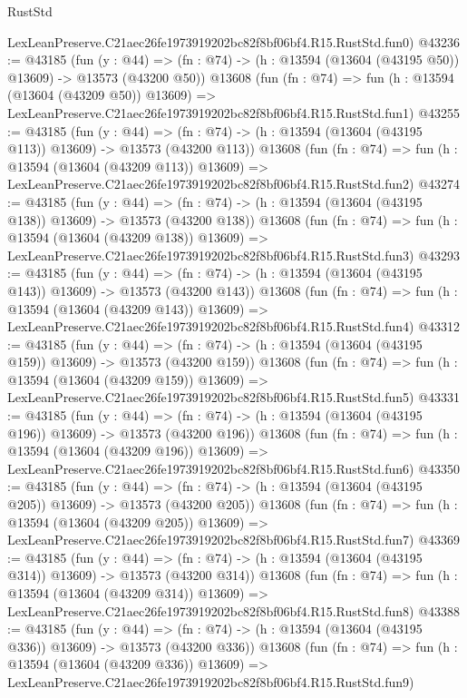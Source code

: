 \begin{lexlean}{RustStd}
\begin{coremodule}
    LexLeanPreserve.C21aec26fe1973919202bc82f8bf06bf4.R15.RustStd.fun0)
@43236 := @43185
    (fun (y : @44) =>
    (fn : @74) -> (h : @13594 (@13604 (@43195 @50)) @13609) -> @13573 (@43200 @50))
    @13608
    (fun (fn : @74) =>
    fun (h : @13594 (@13604 (@43209 @50)) @13609) =>
    LexLeanPreserve.C21aec26fe1973919202bc82f8bf06bf4.R15.RustStd.fun1)
@43255 := @43185
    (fun (y : @44) =>
    (fn : @74) -> (h : @13594 (@13604 (@43195 @113)) @13609) -> @13573 (@43200 @113))
    @13608
    (fun (fn : @74) =>
    fun (h : @13594 (@13604 (@43209 @113)) @13609) =>
    LexLeanPreserve.C21aec26fe1973919202bc82f8bf06bf4.R15.RustStd.fun2)
@43274 := @43185
    (fun (y : @44) =>
    (fn : @74) -> (h : @13594 (@13604 (@43195 @138)) @13609) -> @13573 (@43200 @138))
    @13608
    (fun (fn : @74) =>
    fun (h : @13594 (@13604 (@43209 @138)) @13609) =>
    LexLeanPreserve.C21aec26fe1973919202bc82f8bf06bf4.R15.RustStd.fun3)
@43293 := @43185
    (fun (y : @44) =>
    (fn : @74) -> (h : @13594 (@13604 (@43195 @143)) @13609) -> @13573 (@43200 @143))
    @13608
    (fun (fn : @74) =>
    fun (h : @13594 (@13604 (@43209 @143)) @13609) =>
    LexLeanPreserve.C21aec26fe1973919202bc82f8bf06bf4.R15.RustStd.fun4)
@43312 := @43185
    (fun (y : @44) =>
    (fn : @74) -> (h : @13594 (@13604 (@43195 @159)) @13609) -> @13573 (@43200 @159))
    @13608
    (fun (fn : @74) =>
    fun (h : @13594 (@13604 (@43209 @159)) @13609) =>
    LexLeanPreserve.C21aec26fe1973919202bc82f8bf06bf4.R15.RustStd.fun5)
@43331 := @43185
    (fun (y : @44) =>
    (fn : @74) -> (h : @13594 (@13604 (@43195 @196)) @13609) -> @13573 (@43200 @196))
    @13608
    (fun (fn : @74) =>
    fun (h : @13594 (@13604 (@43209 @196)) @13609) =>
    LexLeanPreserve.C21aec26fe1973919202bc82f8bf06bf4.R15.RustStd.fun6)
@43350 := @43185
    (fun (y : @44) =>
    (fn : @74) -> (h : @13594 (@13604 (@43195 @205)) @13609) -> @13573 (@43200 @205))
    @13608
    (fun (fn : @74) =>
    fun (h : @13594 (@13604 (@43209 @205)) @13609) =>
    LexLeanPreserve.C21aec26fe1973919202bc82f8bf06bf4.R15.RustStd.fun7)
@43369 := @43185
    (fun (y : @44) =>
    (fn : @74) -> (h : @13594 (@13604 (@43195 @314)) @13609) -> @13573 (@43200 @314))
    @13608
    (fun (fn : @74) =>
    fun (h : @13594 (@13604 (@43209 @314)) @13609) =>
    LexLeanPreserve.C21aec26fe1973919202bc82f8bf06bf4.R15.RustStd.fun8)
@43388 := @43185
    (fun (y : @44) =>
    (fn : @74) -> (h : @13594 (@13604 (@43195 @336)) @13609) -> @13573 (@43200 @336))
    @13608
    (fun (fn : @74) =>
    fun (h : @13594 (@13604 (@43209 @336)) @13609) =>
    LexLeanPreserve.C21aec26fe1973919202bc82f8bf06bf4.R15.RustStd.fun9)

\end{coremodule}
\end{lexlean}
